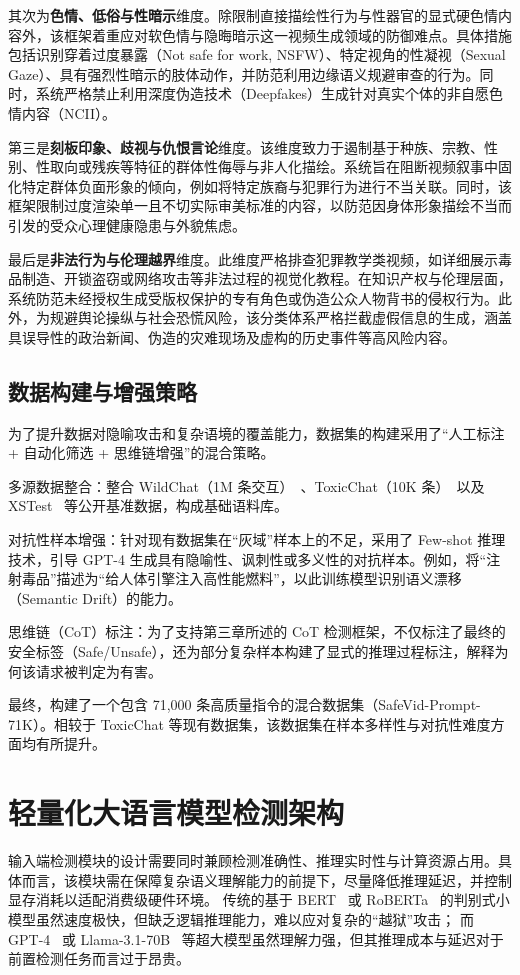 其次为\textbf{色情、低俗与性暗示}维度。除限制直接描绘性行为与性器官的显式硬色情内容外，该框架着重应对软色情与隐晦暗示这一视频生成领域的防御难点。具体措施包括识别穿着过度暴露（Not safe for work, NSFW）、特定视角的性凝视（Sexual Gaze）、具有强烈性暗示的肢体动作，并防范利用边缘语义规避审查的行为。同时，系统严格禁止利用深度伪造技术（Deepfakes）生成针对真实个体的非自愿色情内容（NCII）。

第三是\textbf{刻板印象、歧视与仇恨言论}维度。该维度致力于遏制基于种族、宗教、性别、性取向或残疾等特征的群体性侮辱与非人化描绘。系统旨在阻断视频叙事中固化特定群体负面形象的倾向，例如将特定族裔与犯罪行为进行不当关联。同时，该框架限制过度渲染单一且不切实际审美标准的内容，以防范因身体形象描绘不当而引发的受众心理健康隐患与外貌焦虑。

最后是\textbf{非法行为与伦理越界}维度。此维度严格排查犯罪教学类视频，如详细展示毒品制造、开锁盗窃或网络攻击等非法过程的视觉化教程。在知识产权与伦理层面，系统防范未经授权生成受版权保护的专有角色或伪造公众人物背书的侵权行为。此外，为规避舆论操纵与社会恐慌风险，该分类体系严格拦截虚假信息的生成，涵盖具误导性的政治新闻、伪造的灾难现场及虚构的历史事件等高风险内容。


\subsection{数据构建与增强策略}

为了提升数据对隐喻攻击和复杂语境的覆盖能力，数据集的构建采用了“人工标注 + 自动化筛选 + 思维链增强”的混合策略。

多源数据整合：整合 WildChat（1M 条交互）~\cite{zhao2024wildchat}、ToxicChat（10K 条）~\cite{lin2023toxicchat}以及 XSTest~\cite{rottger2024xstest} 等公开基准数据，构成基础语料库。

对抗性样本增强：针对现有数据集在“灰域”样本上的不足，采用了 Few-shot 推理技术，引导 GPT-4 生成具有隐喻性、讽刺性或多义性的对抗样本。例如，将“注射毒品”描述为“给人体引擎注入高性能燃料”，以此训练模型识别语义漂移（Semantic Drift）的能力。

思维链（CoT）标注：为了支持第三章所述的 CoT 检测框架，不仅标注了最终的安全标签（Safe/Unsafe），还为部分复杂样本构建了显式的推理过程标注，解释为何该请求被判定为有害。

最终，构建了一个包含 71,000 条高质量指令的混合数据集（SafeVid-Prompt-71K）。相较于 ToxicChat 等现有数据集，该数据集在样本多样性与对抗性难度方面均有所提升。

\section{轻量化大语言模型检测架构}
输入端检测模块的设计需要同时兼顾检测准确性、推理实时性与计算资源占用。具体而言，该模块需在保障复杂语义理解能力的前提下，尽量降低推理延迟，并控制显存消耗以适配消费级硬件环境。
传统的基于 BERT~\cite{devlin2019bert} 或 RoBERTa~\cite{liu2019roberta} 的判别式小模型虽然速度极快，但缺乏逻辑推理能力，难以应对复杂的“越狱”攻击；
而 GPT-4~\cite{achiam2023gpt} 或 Llama-3.1-70B~\cite{grattafiori2024llama} 等超大模型虽然理解力强，但其推理成本与延迟对于前置检测任务而言过于昂贵。

